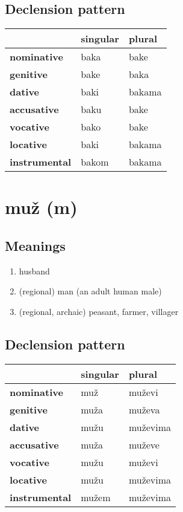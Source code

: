 \subsection*{Declension pattern}
\begin{tabularx}{\linewidth}{Xll}
\toprule
{} & singular &  plural \\
\midrule
\textbf{nominative  } &     baka &    bake \\
\textbf{genitive    } &     bake &    baka \\
\textbf{dative      } &     baki &  bakama \\
\textbf{accusative  } &     baku &    bake \\
\textbf{vocative    } &     bako &    bake \\
\textbf{locative    } &     baki &  bakama \\
\textbf{instrumental} &    bakom &  bakama \\
\bottomrule
\end{tabularx}

\filbreak
\section{muž (m)}
\subsection*{Meanings}
\begin{enumerate}
\item husband
\item (regional) man (an adult human male)
\item (regional, archaic) peasant, farmer, villager
\end{enumerate}
\subsection*{Declension pattern}
\begin{tabularx}{\linewidth}{Xll}
\toprule
{} & singular &    plural \\
\midrule
\textbf{nominative  } &      muž &    muževi \\
\textbf{genitive    } &     muža &    muževa \\
\textbf{dative      } &     mužu &  muževima \\
\textbf{accusative  } &     muža &    muževe \\
\textbf{vocative    } &     mužu &    muževi \\
\textbf{locative    } &     mužu &  muževima \\
\textbf{instrumental} &    mužem &  muževima \\
\bottomrule
\end{tabularx}

